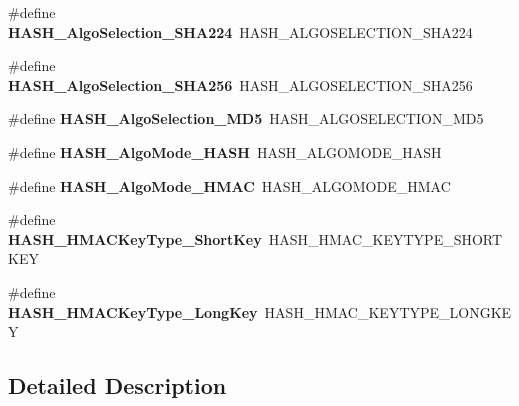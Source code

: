 \begin{DoxyCompactItemize}
\item 
\#define {\bfseries H\+A\+S\+H\+\_\+\+Algo\+Selection\+\_\+\+S\+H\+A224}~H\+A\+S\+H\+\_\+\+A\+L\+G\+O\+S\+E\+L\+E\+C\+T\+I\+O\+N\+\_\+\+S\+H\+A224\hypertarget{group___h_a_l___h_a_s_h___aliased___functions_gaf8b9faddbf24e087ec70742275a16e97}{}\label{group___h_a_l___h_a_s_h___aliased___functions_gaf8b9faddbf24e087ec70742275a16e97}

\item 
\#define {\bfseries H\+A\+S\+H\+\_\+\+Algo\+Selection\+\_\+\+S\+H\+A256}~H\+A\+S\+H\+\_\+\+A\+L\+G\+O\+S\+E\+L\+E\+C\+T\+I\+O\+N\+\_\+\+S\+H\+A256\hypertarget{group___h_a_l___h_a_s_h___aliased___functions_ga4dd93835c16dcffba7e303a2412d58ad}{}\label{group___h_a_l___h_a_s_h___aliased___functions_ga4dd93835c16dcffba7e303a2412d58ad}

\item 
\#define {\bfseries H\+A\+S\+H\+\_\+\+Algo\+Selection\+\_\+\+M\+D5}~H\+A\+S\+H\+\_\+\+A\+L\+G\+O\+S\+E\+L\+E\+C\+T\+I\+O\+N\+\_\+\+M\+D5\hypertarget{group___h_a_l___h_a_s_h___aliased___functions_gac443db7ebfff6d660b9321c59ecf48ed}{}\label{group___h_a_l___h_a_s_h___aliased___functions_gac443db7ebfff6d660b9321c59ecf48ed}

\item 
\#define {\bfseries H\+A\+S\+H\+\_\+\+Algo\+Mode\+\_\+\+H\+A\+SH}~H\+A\+S\+H\+\_\+\+A\+L\+G\+O\+M\+O\+D\+E\+\_\+\+H\+A\+SH\hypertarget{group___h_a_l___h_a_s_h___aliased___functions_ga4de18ef48bad8fe403226abe769bd921}{}\label{group___h_a_l___h_a_s_h___aliased___functions_ga4de18ef48bad8fe403226abe769bd921}

\item 
\#define {\bfseries H\+A\+S\+H\+\_\+\+Algo\+Mode\+\_\+\+H\+M\+AC}~H\+A\+S\+H\+\_\+\+A\+L\+G\+O\+M\+O\+D\+E\+\_\+\+H\+M\+AC\hypertarget{group___h_a_l___h_a_s_h___aliased___functions_ga70224c1ea0eef2f45363f92fc001a875}{}\label{group___h_a_l___h_a_s_h___aliased___functions_ga70224c1ea0eef2f45363f92fc001a875}

\item 
\#define {\bfseries H\+A\+S\+H\+\_\+\+H\+M\+A\+C\+Key\+Type\+\_\+\+Short\+Key}~H\+A\+S\+H\+\_\+\+H\+M\+A\+C\+\_\+\+K\+E\+Y\+T\+Y\+P\+E\+\_\+\+S\+H\+O\+R\+T\+K\+EY\hypertarget{group___h_a_l___h_a_s_h___aliased___functions_ga75d858a8b5b891edc321486eebe74692}{}\label{group___h_a_l___h_a_s_h___aliased___functions_ga75d858a8b5b891edc321486eebe74692}

\item 
\#define {\bfseries H\+A\+S\+H\+\_\+\+H\+M\+A\+C\+Key\+Type\+\_\+\+Long\+Key}~H\+A\+S\+H\+\_\+\+H\+M\+A\+C\+\_\+\+K\+E\+Y\+T\+Y\+P\+E\+\_\+\+L\+O\+N\+G\+K\+EY\hypertarget{group___h_a_l___h_a_s_h___aliased___functions_ga99296878d9ed1d3ede590fdeef8f8394}{}\label{group___h_a_l___h_a_s_h___aliased___functions_ga99296878d9ed1d3ede590fdeef8f8394}

\end{DoxyCompactItemize}


\subsection{Detailed Description}
